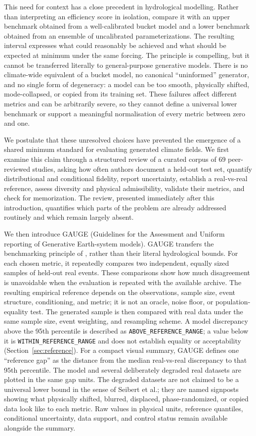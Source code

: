 \documentclass[gmd, manuscript]{copernicus}
\begin{document}
This need for context has a close precedent in hydrological modelling. Rather than
interpreting an efficiency score in isolation, \citet{Seibert2018} compare it with an
upper benchmark obtained from a well-calibrated bucket model and a lower benchmark
obtained from an ensemble of uncalibrated parameterizations. The resulting interval
expresses what could reasonably be achieved and what should be expected at minimum
under the same forcing. The principle is compelling, but it cannot be transferred
literally to general-purpose generative models. There is no climate-wide equivalent of
a bucket model, no canonical ``uninformed'' generator, and no single form of
degeneracy: a model can be too smooth, physically shifted, mode-collapsed, or copied
from its training set. These failures affect different metrics and can be arbitrarily
severe, so they cannot define a universal lower benchmark or support a meaningful
normalisation of every metric between zero and one.

We postulate that these unresolved choices have prevented the emergence of a shared
minimum standard for evaluating generated climate fields. We first examine this claim
through a structured review of a curated corpus of 69 peer-reviewed studies, asking how often
authors document a held-out test set, quantify distributional and conditional
fidelity, report uncertainty, establish a real-vs-real reference, assess diversity and
physical admissibility, validate their metrics, and check for memorization. The review,
presented immediately after this introduction, quantifies which parts of the problem
are already addressed routinely and which remain largely absent.

We then introduce GAUGE (Guidelines for the Assessment and Uniform reporting of
Generative Earth-system models). GAUGE transfers the benchmarking principle of
\citet{Seibert2018}, rather than their literal hydrological bounds. For each chosen
metric, it repeatedly compares two independent, equally sized samples of held-out real
events. These comparisons show how much disagreement is unavoidable when the
evaluation is repeated with the available archive. The resulting empirical reference
depends on the observations, sample size, event structure, conditioning, and metric;
it is not an oracle, noise floor, or population-equality test. The generated sample is then compared
with real data under the same sample size, event weighting, and resampling scheme. A
model discrepancy above the 95th percentile is described as
\texttt{ABOVE\_REFERENCE\_RANGE}; a value below it is
\texttt{WITHIN\_REFERENCE\_RANGE} and does not establish equality or acceptability
(Section~\ref{sec:reference}). For a
compact visual summary, GAUGE
defines one ``reference gap'' as the distance from the median real-vs-real discrepancy
to that 95th percentile. The model and several deliberately degraded real
datasets are plotted in the same gap units. The degraded datasets are not claimed to
be a universal lower bound in the sense of Seibert et al.; they are named signposts showing what physically shifted,
blurred, displaced, phase-randomized, or copied data look like to each metric. Raw
values in physical units, reference quantiles, conditional uncertainty, data support,
and control status remain available alongside the summary.
\end{document}
